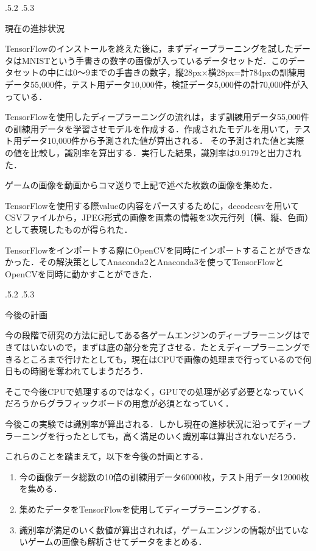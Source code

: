 \documentclass[uplatex]{jsarticle}
\makeatletter
\renewcommand{\section}{%
    \if@slide\clearpage\fi
    \@startsection{section}{1}{\z@}%
    {\Cvs \@plus.5\Cdp \@minus.2\Cdp}%
    {.5\Cvs \@plus.3\Cdp}%
    {\normalfont\raggedright}}
\makeatother
\begin{document}
\section{現在の進捗状況}

TensorFlowのインストールを終えた後に，まずディープラーニングを試したデータはMNISTという手書きの数字の画像が入っているデータセットだ．このデータセットの中には0～9までの手書きの数字，縦28px×横28px=計784pxの訓練用データ55,000件，テスト用データ10,000件，検証データ5,000件の計70,000件が入っている．

TensorFlowを使用したディープラーニングの流れは，まず訓練用データ55,000件の訓練用データを学習させモデルを作成する．作成されたモデルを用いて，テスト用データ10,000件から予測された値が算出される． その予測された値と実際の値を比較し，識別率を算出する．実行した結果，識別率は0.9179と出力された．

ゲームの画像を動画からコマ送りで上記で述べた枚数の画像を集めた．

TensorFlowを使用する際valueの内容をパースするために，decodecsvを用いてCSVファイルから，JPEG形式の画像を画素の情報を3次元行列（横、縦、色面）として表現したものが得られた．

TensorFlowをインポートする際にOpenCVを同時にインポートすることができなかった．その解決策としてAnaconda2とAnaconda3を使ってTensorFlowとOpenCVを同時に動かすことができた．

\section{今後の計画}

今の段階で研究の方法に記してある各ゲームエンジンのディープラーニングはできてはいないので，まずは底の部分を完了させる．たとえディープラーニングできるところまで行けたとしても，現在はCPUで画像の処理まで行っているので何日もの時間を奪われてしまうだろう．

そこで今後CPUで処理するのではなく，GPUでの処理が必ず必要となっていくだろうからグラフィックボードの用意が必須となっていく．

今後この実験では識別率が算出される．しかし現在の進捗状況に沿ってディープラーニングを行ったとしても，高く満足のいく識別率は算出されないだろう．

これらのことを踏まえて，以下を今後の計画とする．

\begin{enumerate}
\item 今の画像データ総数の10倍の訓練用データ60000枚，テスト用データ12000枚を集める．
\item 集めたデータをTensorFlowを使用してディープラーニングする．
\item 識別率が満足のいく数値が算出されれば，ゲームエンジンの情報が出ていないゲームの画像も解析させてデータをまとめる．
\end{enumerate}



\end{document}
